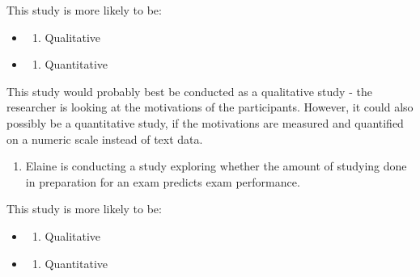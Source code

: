 \documentclass[
  english,
  letterpaper,
  DIV=11,
  numbers=noendperiod]{scrreprt}
\providecommand{\tightlist}{%
  \setlength{\itemsep}{0pt}\setlength{\parskip}{0pt}}
\begin{document}
This study is more likely to be:

\begin{itemize}
\tightlist
\item
  \begin{enumerate}
  \def\labelenumi{(\Alph{enumi})}
  \tightlist
  \item
    Qualitative\\
  \end{enumerate}
\item
  \begin{enumerate}
  \def\labelenumi{(\Alph{enumi})}
  \setcounter{enumi}{1}
  \tightlist
  \item
    Quantitative
  \end{enumerate}
\end{itemize}

\begin{tcolorbox}[enhanced jigsaw, breakable, bottomtitle=1mm, leftrule=.75mm, opacityback=0, colbacktitle=quarto-callout-caution-color!10!white, opacitybacktitle=0.6, toprule=.15mm, colback=white, left=2mm, coltitle=black, bottomrule=.15mm, titlerule=0mm, title={Explain the answer}, toptitle=1mm, colframe=quarto-callout-caution-color-frame, arc=.35mm, rightrule=.15mm]

This study would probably best be conducted as a qualitative study - the
researcher is looking at the motivations of the participants. However,
it could also possibly be a quantitative study, if the motivations are
measured and quantified on a numeric scale instead of text data.

\end{tcolorbox}

\begin{enumerate}
\def\labelenumi{\arabic{enumi}.}
\setcounter{enumi}{4}
\tightlist
\item
  Elaine is conducting a study exploring whether the amount of studying
  done in preparation for an exam predicts exam performance.
\end{enumerate}

This study is more likely to be:

\begin{itemize}
\tightlist
\item
  \begin{enumerate}
  \def\labelenumi{(\Alph{enumi})}
  \tightlist
  \item
    Qualitative\\
  \end{enumerate}
\item
  \begin{enumerate}
  \def\labelenumi{(\Alph{enumi})}
  \setcounter{enumi}{1}
  \tightlist
  \item
    Quantitative
  \end{enumerate}
\end{itemize}
\end{document}
